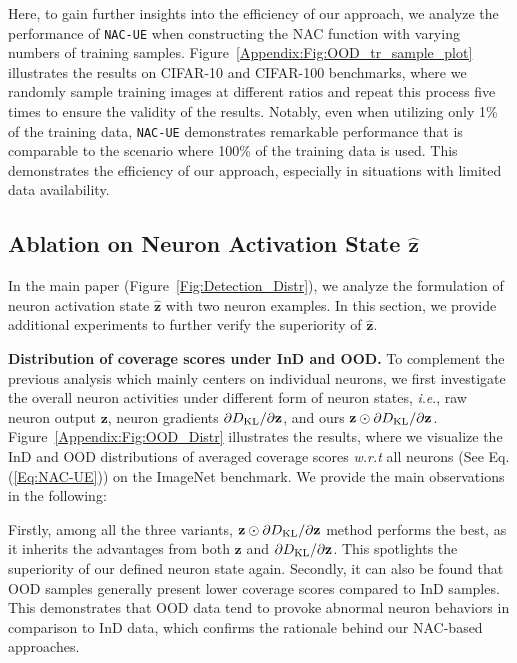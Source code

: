 \documentclass{article} \usepackage{iclr2024_conference,times}
\newcommand{\ie}{\textit{i}.\textit{e}.}
\newcommand{\bfstart}[1]{\noindent\textbf{#1.}}
\begin{document}
Here, to gain further insights into the efficiency of our approach,  we analyze the performance of \texttt{NAC-UE} when constructing the NAC function with varying numbers of training samples. Figure~\ref{Appendix:Fig:OOD_tr_sample_plot} illustrates the results on CIFAR-10 and CIFAR-100 benchmarks, where we randomly sample training images at different ratios and repeat this process five times to ensure the validity of the results.
Notably, even when utilizing only 1\% of the training data, \texttt{NAC-UE} demonstrates remarkable performance that is comparable to the scenario where 100\% of the training data is used. This demonstrates the efficiency of our approach, especially in situations with limited data availability.








\subsection{Ablation on Neuron Activation State $\hat{\mathbf{z}}$}
\label{Appendix:Ablation_NeuronState}
In the main paper (Figure~\ref{Fig:Detection_Distr}), we analyze the formulation of neuron activation state $\hat{\mathbf{z}}$ with two neuron examples. In this section, we provide additional experiments to further verify the superiority of $\hat{\mathbf{z}}$.


\bfstart{Distribution of coverage scores under InD and OOD}
To complement the previous analysis which mainly centers on individual neurons, we first investigate the overall neuron activities under different form of neuron states, \ie, raw neuron output ${\mathbf{z}}$, neuron gradients $\partial D_{\rm KL}/\partial \mathbf{z}$, and ours ${\mathbf{z}} \odot \partial D_{\rm KL}/\partial \mathbf{z}$.
Figure~\ref{Appendix:Fig:OOD_Distr} illustrates the results, where we visualize the InD and OOD distributions of averaged coverage scores \textit{w.r.t} all neurons (See Eq.(\ref{Eq:NAC-UE})) on the ImageNet benchmark. 
We provide the main observations in the following:







Firstly, among all the three variants, ${\mathbf{z}} \odot \partial D_{\rm KL}/\partial \mathbf{z}$ method performs the best, as it inherits the advantages from both ${\mathbf{z}}$ and $\partial D_{\rm KL}/\partial \mathbf{z}$. This spotlights the superiority of our defined neuron state again. 
Secondly, it can also be found that OOD samples generally present lower coverage scores compared to InD samples. This demonstrates that OOD data tend to provoke abnormal neuron behaviors in comparison to InD data, which confirms the rationale behind our NAC-based approaches.
\end{document}
